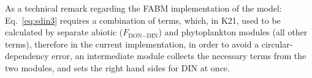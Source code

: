 \documentclass[gmd, manuscript]{copernicus}
\begin{document}
As a technical remark regarding the FABM implementation of the model: Eq.~\eqref{eq:sdin3} requires a combination of terms, which, in K21, used to be calculated by separate abiotic ($F_{\text{DON}-\text{DIN}}$) and phytoplankton modules (all other terms), therefore in the current implementation, in order to avoid a circular-dependency error, an intermediate module collects the necessary terms from the two modules, and sets the right hand sides for DIN at once.
\end{document}
